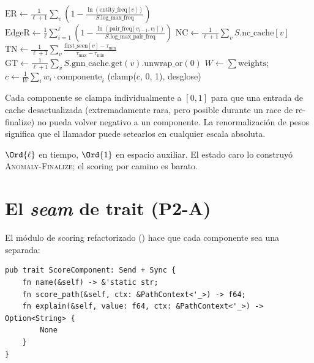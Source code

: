 \begin{algorithm}
\caption{\textsc{Score-Path}}\label{alg:score-path}
$\mathrm{ER} \gets \frac{1}{\ell+1} \sum_v \left(1 - \frac{\ln(\text{entity\_freq}[v])}{S.\text{log\_max\_freq}}\right)$\;
$\mathrm{EdgeR} \gets \frac{1}{\ell} \sum_{i=1}^{\ell} \left(1 - \frac{\ln(\text{pair\_freq}[v_{i-1}, v_i])}{S.\text{log\_max\_pair\_freq}}\right)$\;
$\mathrm{NC} \gets \frac{1}{\ell+1} \sum_v S.\text{nc\_cache}[v]$\;
$\mathrm{TN} \gets \frac{1}{\ell+1} \sum_v \frac{\text{first\_seen}[v] - \tau_{\min}}{\tau_{\max} - \tau_{\min}}$\;
$\mathrm{GT} \gets \frac{1}{\ell+1} \sum_v S.\text{gnn\_cache}.\text{get}(v).\text{unwrap\_or}(0)$\;
$W \gets \sum \text{weights}$; $c \gets \frac{1}{W} \sum_i w_i \cdot \text{componente}_i$\;
\Return (clamp($c$, 0, 1), desglose)\;
\end{algorithm}

Cada componente se clampa individualmente a $[0, 1]$ para que
una entrada de cache desactualizada (extremadamente rara, pero
posible durante un race de re-finalize) no pueda volver
negativo a un componente. La renormalización de pesos significa
que el llamador puede setearlos en cualquier escala absoluta.

\begin{complexity}
$\Ord{\ell}$ en tiempo, $\Ord{1}$ en espacio auxiliar. El estado
caro lo construyó \textsc{Anomaly-Finalize}; el scoring por
camino es barato.
\end{complexity}

\section{El \emph{seam} de trait (P2-A)}

El módulo de scoring refactorizado
() hace que cada
componente sea una  separada:

\begin{lstlisting}[style=rust]
pub trait ScoreComponent: Send + Sync {
    fn name(&self) -> &'static str;
    fn score_path(&self, ctx: &PathContext<'_>) -> f64;
    fn explain(&self, value: f64, ctx: &PathContext<'_>) -> Option<String> {
        None
    }
}
\end{lstlisting}

